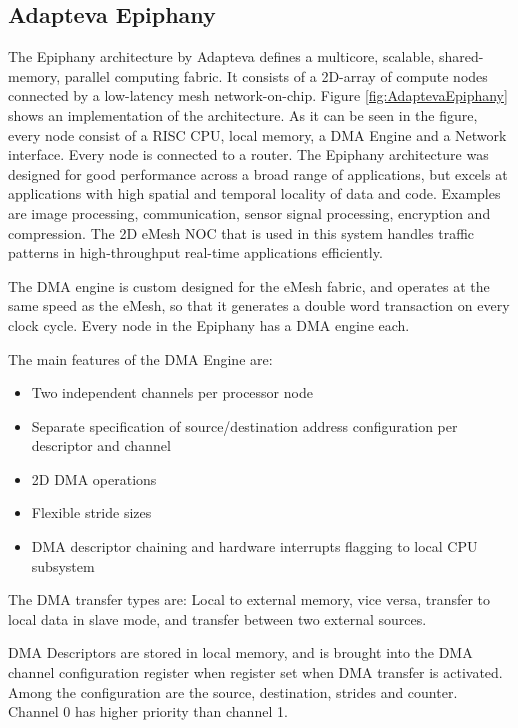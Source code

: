 \subsection{Adapteva Epiphany}
The Epiphany architecture by Adapteva defines a multicore, scalable, shared-memory, parallel computing fabric.
It consists of a 2D-array of compute nodes connected by a low-latency mesh network-on-chip.
Figure \ref{fig:AdaptevaEpiphany} shows an implementation of the architecture.
As it can be seen in the figure, every node consist of a RISC CPU, local memory, a DMA Engine and a Network interface.
Every node is connected to a router.
The Epiphany architecture was designed for good performance across a broad range of applications, but excels at applications with high spatial and temporal locality of data and code.
Examples are image processing, communication, sensor signal processing, encryption and compression.
The 2D eMesh NOC that is used in this system handles traffic patterns in high-throughput real-time applications efficiently.

The DMA engine is custom designed for the eMesh fabric, and operates at the same speed as the eMesh, so that  it generates a double word transaction on every clock cycle.
Every node in the Epiphany has a DMA engine each.

The main features of the DMA Engine are:  
\begin{itemize}
    \item Two independent channels per processor node
    \item Separate specification of source/destination address configuration per descriptor and channel
    \item 2D DMA operations
    \item Flexible stride sizes
    \item DMA descriptor chaining and hardware interrupts flagging to local CPU subsystem
\end{itemize}

The DMA transfer types are: Local to external memory, vice versa, transfer to local data in slave mode, and transfer between two external sources.

DMA Descriptors are stored in local memory, and is brought into the DMA channel configuration register when register set when DMA transfer is activated.
Among the configuration are the source, destination, strides and counter.
Channel 0 has higher priority than channel 1.

